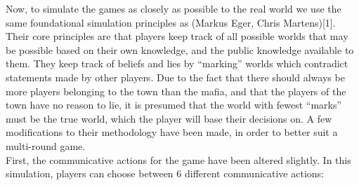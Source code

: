 Now, to simulate the games as closely as possible to the real world we use the
same foundational simulation principles as (Markus Eger, Chris Martens)[1].
Their core principles are that players keep track of all possible worlds that
may be possible based on their own knowledge, and the public knowledge
available to them. They keep track of beliefs and lies by “marking” worlds
which contradict statements made by other players. Due to the fact that there
should always be more players belonging to the town than the mafia, and that
the players of the town have no reason to lie, it is presumed that the world
with fewest “marks” must be the true world, which the player will base their
decisions on. A few modifications to their methodology have been made, in order
to better suit a multi-round game. \\ First, the communicative actions for the
game have been altered slightly. In this simulation, players can choose between
6 different communicative actions:

